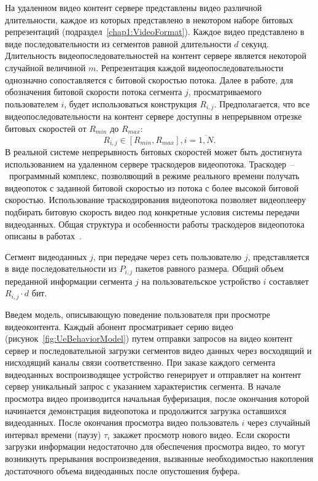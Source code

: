 На удаленном видео контент сервере представлены видео различной длительности, каждое из которых представлено в некотором наборе битовых репрезентаций (подраздел~\ref{chap1:VideoFormat}). Каждое видео представлено в виде последовательности из сегментов равной длительности $d$ секунд. Длительность видеопоследовательностей на контент сервере является некоторой случайной величиной $m$. Репрезентация каждой видеопоследовательности однозначно сопоставляется с битовой скоростью потока. Далее в работе, для обозначения битовой скорости потока сегмента $j$, просматриваемого пользователем $i$, будет использоваться конструкция $R_{i,j}$. Предполагается, что все видеопоследовательности на контент сервере доступны в непрерывном отрезке битовых скоростей от $R_{min}$ до $R_{max}$:
\begin{equation}
R_{i,j} \in [R_{min}, R_{max}], i=\overline{1,N}.
\label{eq:BitrateConstr}
\end{equation}
В реальной системе непрерывность битовых скоростей может быть достигнута использованием на удаленном сервере траскодеров видеопотока. Траскодер~--~программный комплекс, позволяющий в режиме реального времени получать видеопоток с заданной битовой скоростью из потока с более высокой битовой скоростью. Использование траскодирования видеопотока позволяет видеоплееру подбирать битовую скорость видео под конкретные условия системы передачи видеоданных. Общая структура и особенности работы траскодеров видеопотока описаны в работах~\cite{1184336,1369700}.

Сегмент видеоданных $j$, при передаче через сеть пользователю $j$, представляется в виде последовательности из $P_{i,j}$ пакетов равного размера. Общий объем переданной информации сегмента $j$ на пользовательское устройство $i$ составляет $R_{i,j}\cdot d$ бит.

Введем модель, описывающую поведение пользователя при просмотре видеоконтента. Каждый абонент просматривает серию видео (рисунок~\ref{fig:UeBehaviorModel}) путем отправки запросов на видео контент сервер и последовательной загрузки сегментов видео данных через восходящий и нисходящий каналы связи соответственно. При заказе каждого сегмента видеоданных воспроизводящее устройство генерирует и отправляет на контент сервер уникальный запрос с указанием характеристик сегмента. В начале просмотра видео производится начальная буферизация, после окончания которой начинается демонстрация видеопотока и продолжится загрузка оставшихся видеоданных. После окончания просмотра видео пользователь $i$ через случайный интервал времени (паузу) $\tau_i$ закажет просмотр нового видео. Если скорости загрузки информации недостаточно для обеспечения просмотра видео, то могут возникнуть прерывания воспроизведения, вызванные необходимостью накопления достаточного объема видеоданных после опустошения буфера.

